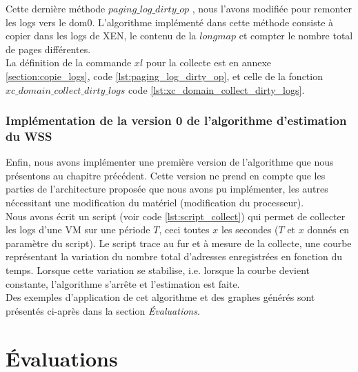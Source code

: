 \noindent Cette dernière méthode $paging\_log\_dirty\_op$ , nous l'avons modifiée pour remonter les logs vers le dom0. L'algorithme implémenté dans cette méthode consiste à copier dans les logs de XEN, le contenu de la $longmap$ et compter le nombre total de pages différentes.\\
La définition de la commande $xl$ pour la collecte est en annexe \ref{section:copie_logs}, code \ref{lst:paging_log_dirty_op}, et celle  de la fonction $xc\_domain\_collect\_dirty\_logs$ code \ref{lst:xc_domain_collect_dirty_logs}.

\subsubsection{Implémentation de la version 0 de l'algorithme d'estimation du WSS}
Enfin, nous avons implémenter une première version de l'algorithme que nous présentons au chapitre précédent. Cette version ne prend en compte que les parties de l'architecture proposée que nous avons pu implémenter, les autres nécessitant une modification du matériel (modification du processeur).\\
Nous avons écrit un script (voir code \ref{lst:script_collect}) qui permet de collecter les logs d'une VM sur une période $T$, ceci toutes $x$ les secondes ($T$ et $x$ donnés en paramètre du script). Le script trace au fur et à mesure de la collecte, une courbe représentant la variation du nombre total d'adresses enregistrées en fonction du temps. Lorsque cette variation se stabilise, i.e. lorsque la courbe devient constante, l'algorithme s'arrête et l'estimation est faite. \\
Des exemples d'application de cet algorithme et des graphes générés sont présentés ci-après dans la section \textit{Évaluations}.

\section{Évaluations}

